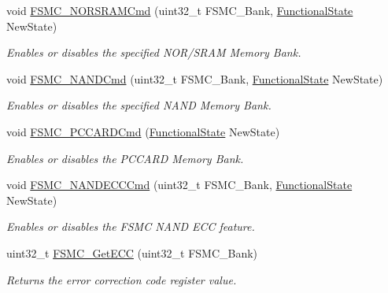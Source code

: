 \begin{DoxyCompactItemize}
void \hyperlink{group___f_s_m_c___private___functions_gaf943f0f2680168d3a95a3c2c9f3eca2a}{F\+S\+M\+C\+\_\+\+N\+O\+R\+S\+R\+A\+M\+Cmd} (uint32\+\_\+t F\+S\+M\+C\+\_\+\+Bank, \hyperlink{group___exported__types_gac9a7e9a35d2513ec15c3b537aaa4fba1}{Functional\+State} New\+State)
\begin{DoxyCompactList}\small\item\em Enables or disables the specified N\+O\+R/\+S\+R\+AM Memory Bank. \end{DoxyCompactList}\item 
void \hyperlink{group___f_s_m_c___private___functions_ga33ec7c39ea4d42e92c72c6e517d8235c}{F\+S\+M\+C\+\_\+\+N\+A\+N\+D\+Cmd} (uint32\+\_\+t F\+S\+M\+C\+\_\+\+Bank, \hyperlink{group___exported__types_gac9a7e9a35d2513ec15c3b537aaa4fba1}{Functional\+State} New\+State)
\begin{DoxyCompactList}\small\item\em Enables or disables the specified N\+A\+ND Memory Bank. \end{DoxyCompactList}\item 
void \hyperlink{group___f_s_m_c___private___functions_ga2d410151ceb3428c6a1bf374a0472cde}{F\+S\+M\+C\+\_\+\+P\+C\+C\+A\+R\+D\+Cmd} (\hyperlink{group___exported__types_gac9a7e9a35d2513ec15c3b537aaa4fba1}{Functional\+State} New\+State)
\begin{DoxyCompactList}\small\item\em Enables or disables the P\+C\+C\+A\+RD Memory Bank. \end{DoxyCompactList}\item 
void \hyperlink{group___f_s_m_c___private___functions_ga5800301fc39bbe998a18ebd9ff191cdc}{F\+S\+M\+C\+\_\+\+N\+A\+N\+D\+E\+C\+C\+Cmd} (uint32\+\_\+t F\+S\+M\+C\+\_\+\+Bank, \hyperlink{group___exported__types_gac9a7e9a35d2513ec15c3b537aaa4fba1}{Functional\+State} New\+State)
\begin{DoxyCompactList}\small\item\em Enables or disables the F\+S\+MC N\+A\+ND E\+CC feature. \end{DoxyCompactList}\item 
uint32\+\_\+t \hyperlink{group___f_s_m_c___private___functions_gaad6d4f5b5a41684ce053fea55bdb98d8}{F\+S\+M\+C\+\_\+\+Get\+E\+CC} (uint32\+\_\+t F\+S\+M\+C\+\_\+\+Bank)
\begin{DoxyCompactList}\small\item\em Returns the error correction code register value. \end{DoxyCompactList}\item 

\end{DoxyCompactItemize}
